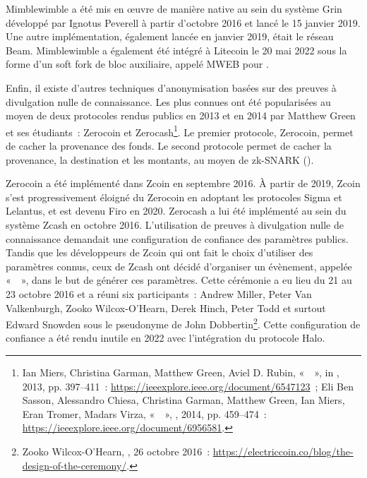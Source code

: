 Mimblewimble a été mis en œuvre de manière native au sein du système Grin développé par Ignotus Peverell à partir d'octobre 2016 et lancé le 15 janvier 2019. Une autre implémentation, également lancée en janvier 2019, était le réseau Beam. Mimblewimble a également été intégré à Litecoin le 20 mai 2022 sous la forme d'un soft fork de bloc auxiliaire, appelé MWEB pour . %


Enfin, il existe d'autres techniques d'anonymisation basées sur des preuves à divulgation nulle de connaissance. Les plus connues ont été popularisées au moyen de deux protocoles rendus publics en 2013 et en 2014 par Matthew Green et ses étudiants~: Zerocoin et Zerocash\footnote{Ian Miers, Christina Garman, Matthew Green, Aviel D. Rubin, «~~», in , 2013, pp. 397--411~: \url{https://ieeexplore.ieee.org/document/6547123}~; Eli Ben Sasson, Alessandro Chiesa, Christina Garman, Matthew Green, Ian Miers, Eran Tromer, Madars Virza, «~~», , 2014, pp. 459--474~: \url{https://ieeexplore.ieee.org/document/6956581}.}. Le premier protocole, Zerocoin, permet de cacher la provenance des fonds. Le second protocole permet de cacher la provenance, la destination et les montants, au moyen de zk-SNARK ().

Zerocoin a été implémenté dans Zcoin en septembre 2016. À partir de 2019, Zcoin s'est progressivement éloigné du Zerocoin en adoptant les protocoles Sigma et Lelantus, et est devenu Firo en 2020. Zerocash a lui été implémenté au sein du système Zcash en octobre 2016. L'utilisation de preuves à divulgation nulle de connaissance demandait une configuration de confiance des paramètres publics. Tandis que les développeurs de Zcoin qui ont fait le choix d'utiliser des paramètres connus, ceux de Zcash ont décidé d'organiser un évènement, appelée «~~», dans le but de générer ces paramètres. Cette cérémonie a eu lieu du 21 au 23 octobre 2016 et a réuni six participants~: Andrew Miller, Peter Van Valkenburgh, Zooko Wilcox-O'Hearn, Derek Hinch, Peter Todd et surtout Edward Snowden sous le pseudonyme de John Dobbertin\footnote{Zooko Wilcox-O'Hearn, , 26 octobre 2016~: \url{https://electriccoin.co/blog/the-design-of-the-ceremony/}.}. Cette configuration de confiance a été rendu inutile en 2022 avec l'intégration du protocole Halo.

